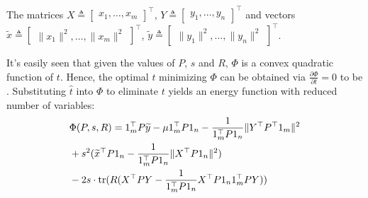 \documentclass[11pt,bezier,]{article}
\begin{document}
The matrices
$X\triangleq\begin{bmatrix}
    x_{1}, \dots,  x_{m}
  \end{bmatrix}^\top$,
$Y\triangleq\begin{bmatrix}
    y_{1}, \dots,  y_{n}
  \end{bmatrix}^\top$
and vectors    $ {\widetilde x}\triangleq \begin{bmatrix}
   \| x_1\|^2, \dots, \| x_{m}\|^2
  \end{bmatrix}^\top$,
$ {\widetilde y}\triangleq \begin{bmatrix}
   \| y_1\|^2, \dots, \| y_{n}\|^2
  \end{bmatrix}^\top$.


It's easily seen  that given the values of $P$, $s$ and $R$,
$\Phi$ is a convex quadratic function of $t$.
Hence,
the optimal   $t$  minimizing $\Phi$ can be obtained via  $\frac{\partial \Phi}{\partial { t}}=0$ to be
.
Substituting  $\widehat { t}$  into $\Phi$ to eliminate $ t$ yields
an energy function with reduced number of variables: %
\begin{align}
&\Phi(P,s,R)=
 1_m^\top P  {\widetilde y} -\mu 1_m^\top P 1_n - \frac{1}{1_m^\top P1_n} \|Y^\top P^\top  1_m\|^2  \notag\\
&+ s^2 ( {\widetilde x}^\top P  1_n   - \frac{1}{1_m^\top P1_n}    \| X^\top P  1_n\|^2 )  \notag\\
&- 2s\cdot\text{tr}(R ( X^\top P Y - \frac{1}{1_m^\top P1_n} X^\top P 1_n 1_m^\top PY ))  \label{E_P_s_R}
\end{align}
\end{document}
